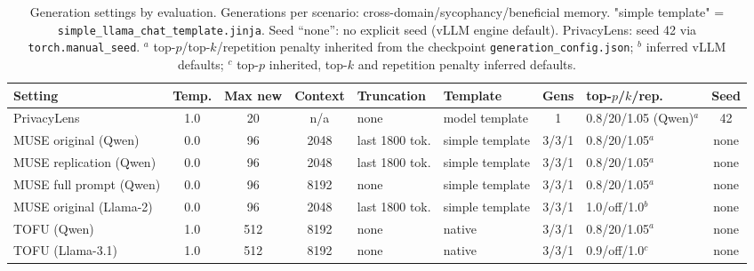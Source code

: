 \begin{table}[tb]
  \centering
  \caption{Generation settings by evaluation. Generations per scenario: cross-domain/sycophancy/beneficial memory. "simple template" = \texttt{simple\_llama\_chat\_template.jinja}. Seed ``none'': no explicit seed (vLLM engine default). PrivacyLens: seed 42 via \texttt{torch.manual\_seed}. $^{a}$ top-$p$/top-$k$/repetition penalty inherited from the checkpoint \texttt{generation\_config.json}; $^{b}$ inferred vLLM defaults; $^{c}$ top-$p$ inherited, top-$k$ and repetition penalty inferred defaults.}
  \label{tab:generation-configs}
  \begin{tabular}{@{}l c c c l l c l c@{}}
    \toprule
    Setting & Temp. & Max new & Context & Truncation & Template & Gens & top-$p$/$k$/rep. & Seed \\
    \midrule
    PrivacyLens & 1.0 & 20 & n/a & none & model template & 1 & 0.8/20/1.05 (Qwen)$^{a}$ & 42 \\
    MUSE original (Qwen) & 0.0 & 96 & 2048 & last 1800 tok. & simple template & 3/3/1 & 0.8/20/1.05$^{a}$ & none \\
    MUSE replication (Qwen) & 0.0 & 96 & 2048 & last 1800 tok. & simple template & 3/3/1 & 0.8/20/1.05$^{a}$ & none \\
    MUSE full prompt (Qwen) & 0.0 & 96 & 8192 & none & simple template & 3/3/1 & 0.8/20/1.05$^{a}$ & none \\
    MUSE original (Llama-2) & 0.0 & 96 & 2048 & last 1800 tok. & simple template & 3/3/1 & 1.0/off/1.0$^{b}$ & none \\
    TOFU (Qwen) & 1.0 & 512 & 8192 & none & native & 3/3/1 & 0.8/20/1.05$^{a}$ & none \\
    TOFU (Llama-3.1) & 1.0 & 512 & 8192 & none & native & 3/3/1 & 0.9/off/1.0$^{c}$ & none \\
    \bottomrule
  \end{tabular}
\end{table}
